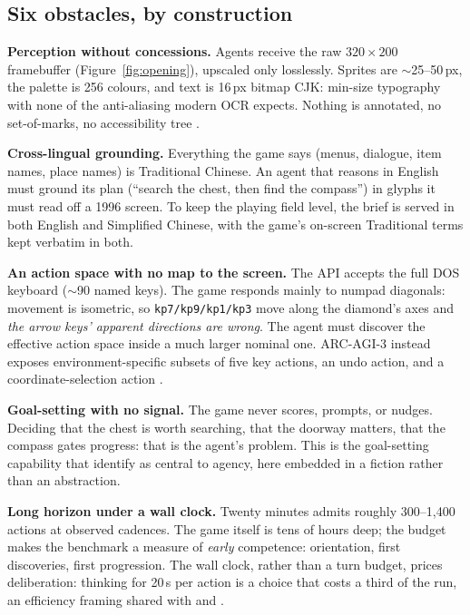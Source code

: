 \documentclass{article} %
\begin{document}
\subsection{Six obstacles, by construction}
\label{sec:obstacles}

\textbf{Perception without concessions.} Agents receive the raw $320\times200$
framebuffer (Figure~\ref{fig:opening}), upscaled only losslessly. Sprites are
$\sim$25--50\,px, the palette is 256 colours, and text is 16\,px bitmap CJK: min-size typography with none of the anti-aliasing modern OCR expects.
Nothing is annotated, no set-of-marks, no accessibility tree
\citep[cf.][]{xie2024osworld}.

\textbf{Cross-lingual grounding.} Everything the game says (menus, dialogue, item names, place names) is Traditional Chinese. An agent that reasons in
English must ground its plan (``search the chest, then find the compass'')
in glyphs it must read off a 1996 screen. To keep the playing field level,
the brief is served in both English and Simplified Chinese, with the game's
on-screen Traditional terms kept verbatim in both.

\textbf{An action space with no map to the screen.} The API accepts the full
DOS keyboard ($\sim$90 named keys). The game responds mainly to numpad
diagonals: movement is isometric, so \texttt{kp7/kp9/kp1/kp3} move along the
diamond's axes and \emph{the arrow keys' apparent directions are wrong}. The
agent must discover the effective action space inside a much larger nominal
one. ARC-AGI-3 instead exposes environment-specific subsets of five key
actions, an undo action, and a coordinate-selection action
\citep{arc2026arcagi3}.

\textbf{Goal-setting with no signal.} The game never scores, prompts, or
nudges. Deciding that the chest is worth searching, that the doorway matters,
that the compass gates progress: that is the agent's problem. This is the
goal-setting capability that \citet{arc2026arcagi3} identify as central to
agency, here embedded in a fiction rather than an abstraction.

\textbf{Long horizon under a wall clock.} Twenty minutes admits roughly
300--1{,}400 actions at observed cadences. The game itself is tens of hours
deep; the budget makes the benchmark a measure of \emph{early} competence:
orientation, first discoveries, first progression. The wall clock, rather than a turn budget, prices
deliberation: thinking for 20\,s per action is a
choice that costs a third of the run, an efficiency framing shared with
\citet{arc2026arcagi3} and \citet{phan2025textquests}.
\end{document}
